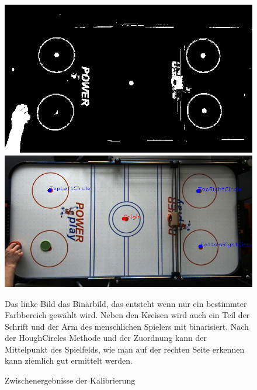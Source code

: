 \begin{figure} [h]
\begin{minipage}[t]{0.4\textwidth}
\vspace{0pt}
\includegraphics[scale =0.3]{images/kalib_bin}


\end{minipage}
\hspace{0.1\textwidth}
\begin{minipage}[t]{0.4\textwidth}
\vspace{0pt}
\includegraphics[scale =0.3]{images/kalib_circ}

\end{minipage}
 \caption{Zwischenergebnisse der Kalibrierung}
 \label{kalib_process}
\vspace{5pt}

Das linke Bild das Binärbild, das entsteht wenn nur ein bestimmter Farbbereich gewählt wird. Neben den Kreisen wird auch ein Teil der Schrift und der Arm des menschlichen Spielers mit binarisiert. Nach der HoughCircles Methode und der Zuordnung kann der Mittelpunkt des Spielfelds, wie man auf der rechten Seite erkennen kann ziemlich gut ermittelt werden.
\end{figure}

